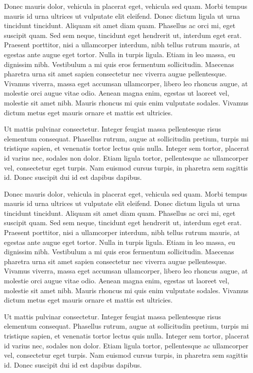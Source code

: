 \documentclass{FramateX}
\begin{document}
Donec mauris dolor, vehicula in placerat eget, vehicula sed quam. Morbi tempus mauris id urna ultrices ut vulputate elit eleifend. Donec dictum ligula ut urna tincidunt tincidunt. Aliquam sit amet diam quam. Phasellus ac orci mi, eget suscipit quam. Sed sem neque, tincidunt eget hendrerit ut, interdum eget erat. Praesent porttitor, nisi a ullamcorper interdum, nibh tellus rutrum mauris, at egestas ante augue eget tortor. Nulla in turpis ligula. Etiam in leo massa, eu dignissim nibh. Vestibulum a mi quis eros fermentum sollicitudin. Maecenas pharetra urna sit amet sapien consectetur nec viverra augue pellentesque. Vivamus viverra, massa eget accumsan ullamcorper, libero leo rhoncus augue, at molestie orci augue vitae odio. Aenean magna enim, egestas ut laoreet vel, molestie sit amet nibh. Mauris rhoncus mi quis enim vulputate sodales. Vivamus dictum metus eget mauris ornare et mattis est ultricies.


Ut mattis pulvinar consectetur. Integer feugiat massa pellentesque risus elementum consequat. Phasellus rutrum, augue at sollicitudin pretium, turpis mi tristique sapien, et venenatis tortor lectus quis nulla. Integer sem tortor, placerat id varius nec, sodales non dolor. Etiam ligula tortor, pellentesque ac ullamcorper vel, consectetur eget turpis. Nam euismod cursus turpis, in pharetra sem sagittis id. Donec suscipit dui id est dapibus dapibus.

Donec mauris dolor, vehicula in placerat eget, vehicula sed quam. Morbi tempus mauris id urna ultrices ut vulputate elit eleifend. Donec dictum ligula ut urna tincidunt tincidunt. Aliquam sit amet diam quam. Phasellus ac orci mi, eget suscipit quam. Sed sem neque, tincidunt eget hendrerit ut, interdum eget erat. Praesent porttitor, nisi a ullamcorper interdum, nibh tellus rutrum mauris, at egestas ante augue eget tortor. Nulla in turpis ligula. Etiam in leo massa, eu dignissim nibh. Vestibulum a mi quis eros fermentum sollicitudin. Maecenas pharetra urna sit amet sapien consectetur nec viverra augue pellentesque. Vivamus viverra, massa eget accumsan ullamcorper, libero leo rhoncus augue, at molestie orci augue vitae odio. Aenean magna enim, egestas ut laoreet vel, molestie sit amet nibh. Mauris rhoncus mi quis enim vulputate sodales. Vivamus dictum metus eget mauris ornare et mattis est ultricies.


Ut mattis pulvinar consectetur. Integer feugiat massa pellentesque risus elementum consequat. Phasellus rutrum, augue at sollicitudin pretium, turpis mi tristique sapien, et venenatis tortor lectus quis nulla. Integer sem tortor, placerat id varius nec, sodales non dolor. Etiam ligula tortor, pellentesque ac ullamcorper vel, consectetur eget turpis. Nam euismod cursus turpis, in pharetra sem sagittis id. Donec suscipit dui id est dapibus dapibus.
\end{document}

